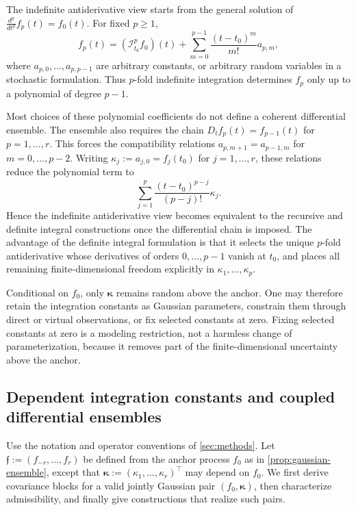 \documentclass[11pt,a4paper]{article}
\theoremstyle{definition}
\theoremstyle{remark}
\begin{document}
The indefinite antiderivative view starts from the general solution of \(\frac{d^p}{dt^p}f_p(t)=f_0(t)\). For fixed \(p\geq 1\),
\[
f_p(t)= (\mathcal I_{t_0}^p f_0)(t)+\sum_{m=0}^{p-1}\frac{(t-t_0)^m}{m!}a_{p,m},
\]
where \(a_{p,0},\ldots,a_{p,p-1}\) are arbitrary constants, or arbitrary random variables in a stochastic formulation. Thus \(p\)-fold indefinite integration determines \(f_p\) only up to a polynomial of degree \(p-1\).

Most choices of these polynomial coefficients do not define a coherent differential ensemble. The ensemble also requires the chain \(D_t f_p(t)=f_{p-1}(t)\) for \(p=1,\ldots,r\). This forces the compatibility relations
$a_{p,m+1}=a_{p-1,m}$ for $m=0,\ldots,p-2$. Writing $\kappa_j:=a_{j,0}=f_j(t_0)$ for $j=1,\ldots,r$, these relations reduce the polynomial term to
\[
\sum_{j=1}^p \frac{(t-t_0)^{p-j}}{(p-j)!}\kappa_j.
\]
Hence the indefinite antiderivative view becomes equivalent to the recursive and definite integral constructions once the differential chain is imposed. The advantage of the definite integral formulation is that it selects the unique \(p\)-fold antiderivative whose derivatives of orders \(0,\ldots,p-1\) vanish at \(t_0\), and places all remaining finite-dimensional freedom explicitly in \(\kappa_1,\ldots,\kappa_p\).

Conditional on \(f_0\), only \(\boldsymbol{\kappa}\) remains random above the anchor. One may therefore retain the integration constants as Gaussian parameters, constrain them through direct or virtual observations, or fix selected constants at zero. Fixing selected constants at zero is a modeling restriction, not a harmless change of parameterization, because it removes part of the finite-dimensional uncertainty above the anchor.




\subsection{Dependent integration constants and coupled differential ensembles}\label{appendix:dependent-integration-constants}

Use the notation and operator conventions of \cref{sec:methods}. Let \(\mathfrak{f}:=(f_{-r},\ldots,f_r)\) be defined from the anchor process \(f_0\) as in \cref{prop:gaussian-ensemble}, except that \(\boldsymbol{\kappa}:=(\kappa_1,\ldots,\kappa_r)^\top\) may depend on \(f_0\). We first derive covariance blocks for a valid jointly Gaussian pair \((f_0,\boldsymbol{\kappa})\), then characterize admissibility, and finally give constructions that realize such pairs.
\end{document}
